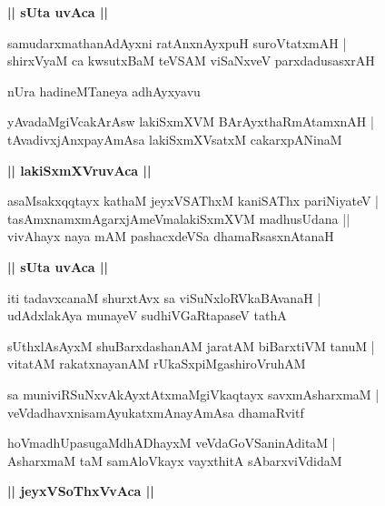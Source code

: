 \documentclass[twoside,12pt,openright]{book}
\newcounter{shloka}[chapter]
\def\uvaca#1{\centerline{{\large\textbf{#1}}}}
\begin{document}
\uvaca{|| sUta uvAca ||}

\begin{shloka}%
samudarxmathanAdAyxni ratAnxnAyxpuH suroVtatxmAH |\\
shirxVyaM ca kwsutxBaM teVSAM viSaNxveV parxdadusasxrAH 
\end{shloka}

\begin{center}
nUra hadineMTaneya adhAyxyavu
\end{center}

\begin{shloka}%
yAvadaMgiVcakArAsw lakiSxmXVM BArAyxthaRmAtamxnAH  |\\
tAvadivxjAnxpayAmAsa lakiSxmXVsatxM cakarxpANinaM 
\end{shloka}

\uvaca{|| lakiSxmXVruvAca ||}

\begin{shloka}%
asaMsakxqqtayx kathaM jeyxVSAThxM kaniSAThx pariNiyateV |\\
tasAmxnamxmAgarxjAmeVmalakiSxmXVM madhusUdana ||\\
vivAhayx naya mAM pashacxdeVSa dhamaRsasxnAtanaH	
\end{shloka}

\uvaca{|| sUta uvAca ||}

\begin{shloka}%
iti tadavxcanaM shurxtAvx sa viSuNxloRVkaBAvanaH |\\
udAdxlakAya munayeV sudhiVGaRtapaseV tathA 
\end{shloka}

\begin{shloka}%
sUthxlAsAyxM shuBarxdashanAM jaratAM biBarxtiVM tanuM |\\
vitatAM rakatxnayanAM rUkaSxpiMgashiroVruhAM 
\end{shloka}

\begin{shloka}%
sa muniviRSuNxvAkAyxtAtxmaMgiVkaqtayx savxmAsharxmaM |\\
veVdadhavxnisamAyukatxmAnayAmAsa dhamaRvitf
\end{shloka}

\begin{shloka}%
hoVmadhUpasugaMdhADhayxM veVdaGoVSaninAditaM |\\
AsharxmaM taM samAloVkayx vayxthitA sAbarxviVdidaM 
\end{shloka}

\uvaca{|| jeyxVSoThxVvAca ||}
\end{document}
